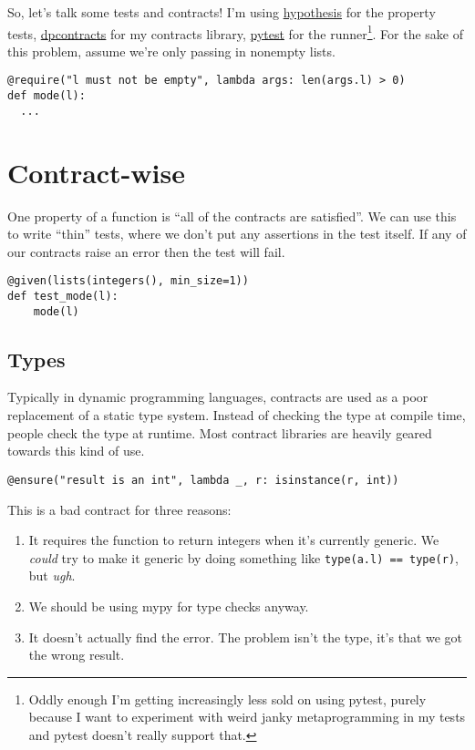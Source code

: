 So, let's talk some tests and contracts! I'm using
\href{http://hypothesis.works/}{hypothesis} for the property tests,
\href{https://github.com/deadpixi/contracts}{dpcontracts} for my
contracts library, \href{https://docs.pytest.org/en/latest/}{pytest} for
the runner\footnote{Oddly enough I'm getting increasingly less sold on using pytest, purely because I want to experiment with weird janky metaprogramming in my tests and pytest doesn't really support that.}.
For the sake of this problem, assume we're only passing in nonempty
lists.

\begin{verbatim}
@require("l must not be empty", lambda args: len(args.l) > 0)
def mode(l):
  ...
\end{verbatim}

\section{Contract-wise}
\label{contract-wise}

One property of a function is ``all of the contracts are satisfied''. We
can use this to write ``thin'' tests, where we don't put any assertions
in the test itself. If any of our contracts raise an error then the test
will fail.

\begin{verbatim}
@given(lists(integers(), min_size=1))
def test_mode(l):
    mode(l)
\end{verbatim}

\subsection{Types}
\label{types}

Typically in dynamic programming languages, contracts are used as a poor
replacement of a static type system. Instead of checking the type at
compile time, people check the type at runtime. Most contract libraries
are heavily geared towards this kind of use.

\begin{verbatim}
@ensure("result is an int", lambda _, r: isinstance(r, int))
\end{verbatim}
This is a bad contract for three reasons:

\begin{enumerate}
\item
  It requires the function to return integers when it's currently
  generic. We \emph{could} try to make it generic by doing something
  like \texttt{type(a.l)\ ==\ type(r)}, but \emph{ugh}.
\item
  We should be using mypy for type checks anyway.
\item
  It doesn't actually find the error. The problem isn't the type, it's
  that we got the wrong result.
\end{enumerate}

